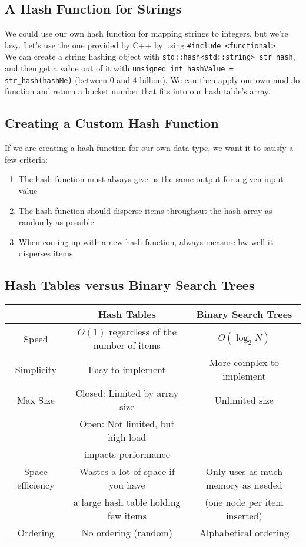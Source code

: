 \documentclass[class=article, crop=false]{standalone}
\begin{document}
  \subsection{A Hash Function for Strings}
  We could use our own hash function for mapping strings to integers, but we're lazy. Let's use the one provided by C++ by using \texttt{\#include <functional>}. \\[10pt]
  We can create a string hashing object with \texttt{std::hash<std::string> str\_hash}, and then get a value out of it with \texttt{unsigned int hashValue = str\_hash(hashMe)} (between $0$ and $4$ billion). We can then apply our own modulo function and return a bucket number that fits into our hash table's array.
  \subsection{Creating a Custom Hash Function}
  If we are creating a hash function for our own data type, we want it to satisfy a few criteria:
  \begin{enumerate}
    \item The hash function must always give us the same output for a given input value
    \item The hash function should disperse items throughout the hash array as randomly as possible
    \item When coming up with a new hash function, always measure hw well it disperses items
  \end{enumerate}
  \subsection{Hash Tables versus Binary Search Trees}
  \begin{center}\begin{tabular}{c|c|c}
    & Hash Tables & Binary Search Trees \\
    \hline
    Speed & $O(1)$ regardless of the number of items & $O(\log_2N)$ \\
    \hline
    Simplicity & Easy to implement & More complex to implement \\
    \hline
    Max Size & Closed: Limited by array size & Unlimited size \\
             & Open: Not limited, but high load & \\
             & impacts performance & \\ 
    \hline
    Space efficiency & Wastes a lot of space if you have & Only uses as much memory as needed \\
                     & a large hash table holding few items & (one node per item inserted) \\
    \hline
    Ordering & No ordering (random) & Alphabetical ordering
  \end{tabular}\end{center}
\end{document}
